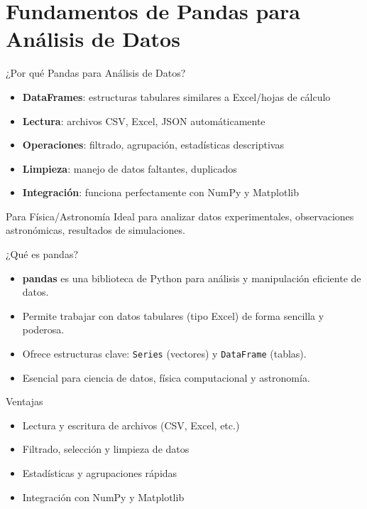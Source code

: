 \documentclass[10pt]{beamer}
\begin{document}
\section{Fundamentos de Pandas para Análisis de Datos}
\begin{frame}{¿Por qué Pandas para Análisis de Datos?}
  \begin{itemize}
    \item \textbf{DataFrames}: estructuras tabulares similares a Excel/hojas de cálculo
    \item \textbf{Lectura}: archivos CSV, Excel, JSON automáticamente
    \item \textbf{Operaciones}: filtrado, agrupación, estadísticas descriptivas
    \item \textbf{Limpieza}: manejo de datos faltantes, duplicados
    \item \textbf{Integración}: funciona perfectamente con NumPy y Matplotlib
  \end{itemize}
  
  \begin{alertblock}{Para Física/Astronomía}
    Ideal para analizar datos experimentales, observaciones astronómicas, resultados de simulaciones.
  \end{alertblock}
\end{frame}

\begin{frame}{¿Qué es pandas?}
  \begin{itemize}
    \item \textbf{pandas} es una biblioteca de Python para análisis y manipulación eficiente de datos.
    \item Permite trabajar con datos tabulares (tipo Excel) de forma sencilla y poderosa.
    \item Ofrece estructuras clave: \texttt{Series} (vectores) y \texttt{DataFrame} (tablas).
    \item Esencial para ciencia de datos, física computacional y astronomía.
  \end{itemize}
  \begin{block}{Ventajas}
    \begin{itemize}
      \item Lectura y escritura de archivos (CSV, Excel, etc.)
      \item Filtrado, selección y limpieza de datos
      \item Estadísticas y agrupaciones rápidas
      \item Integración con NumPy y Matplotlib
    \end{itemize}
  \end{block}
\end{frame}
\end{document}
